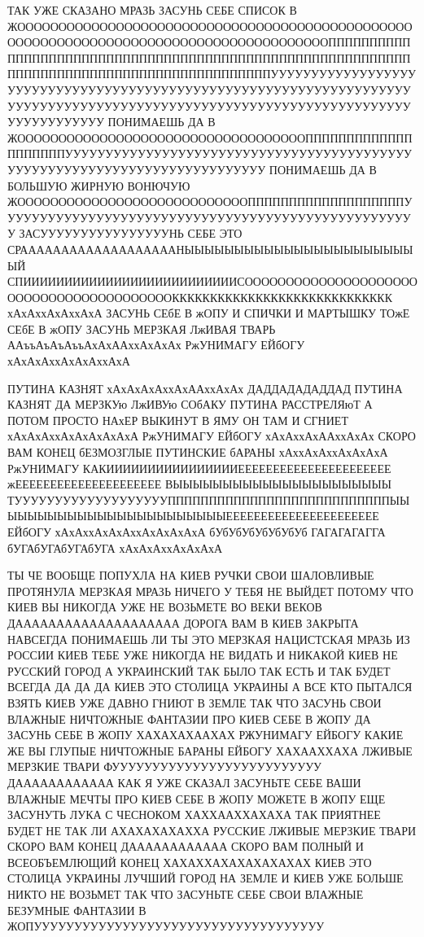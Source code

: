  
 
 
 
 

ТАК УЖЕ СКАЗАНО МРАЗЬ ЗАСУНЬ СЕБЕ СПИСОК В
ЖОООООООООООООООООООООООООООООООООООООООООООООООООООООООООООООООООООООООООООООООООООООООПППППППППППППППППППППППППППППППППППППППППППППППППППППППППППППППППППППППППППППППППППППППППППУУУУУУУУУУУУУУУУУУУУУУУУУУУУУУУУУУУУУУУУУУУУУУУУУУУУУУУУУУУУУУУУУУУУУУУУУУУУУУУУУУУУУУУУУУУУУУУУУУУУУУУУУУУУУУУУУУУУУУУУУУУУУУУУУУ
ПОНИМАЕШЬ ДА В
ЖОООООООООООООООООООООООООООООООООООППППППППППППППППППППУУУУУУУУУУУУУУУУУУУУУУУУУУУУУУУУУУУУУУУУУУУУУУУУУУУУУУУУУУУУУУУУУУУУУУУУУУУ
ПОНИМАЕШЬ ДА В БОЛЬШУЮ ЖИРНУЮ ВОНЮЧУЮ
ЖООООООООООООООООООООООООООООПППППППППППППППППППУУУУУУУУУУУУУУУУУУУУУУУУУУУУУУУУУУУУУУУУУУУУУУУУУУУУ
ЗАСУУУУУУУУУУУУУУУУНЬ СЕБЕ ЭТО СРАААААААААААААААААААНЫЫЫЫЫЫЫЫЫЫЫЫЫЫЫЫЫЫЫЫЫЫЫЫЙ
СПИИИИИИИИИИИИИИИИИИИИИИИИИИСОООООООООООООООООООООООООООООООООООООООООККККККККККККККККККККККККККККК
хАхАххАхАххАхА ЗАСУНЬ СЕбЕ В жОПУ И СПИЧКИ И МАРТЫШКУ ТОжЕ СЕбЕ В жОПУ ЗАСУНЬ МЕРЗКАЯ ЛжИВАЯ ТВАРЬ
ААъъАъАъАъъАхАхААххАхАхАх РжУНИМАГУ ЕЙбОГУ хАхАхАххАхАхАххАхА


ПУТИНА КАЗНЯТ хАхАхАхАххАхААххАхАх ДАДДАДАДАДДАД ПУТИНА КАЗНЯТ ДА МЕРЗКУю ЛжИВУю СОбАКУ
ПУТИНА РАССТРЕЛЯюТ А ПОТОМ ПРОСТО НАхЕР ВЫКИНУТ В ЯМУ ОН ТАМ И СГНИЕТ хАхАхАххАхАхАхАхАхА
РжУНИМАГУ ЕЙбОГУ хАхАххАхААххАхАх СКОРО ВАМ КОНЕЦ бЕЗМОЗГЛЫЕ ПУТИНСКИЕ бАРАНЫ хАххАхАххАхАхАхА
РжУНИМАГУ КАКИИИИИИИИИИИИИИИИЕЕЕЕЕЕЕЕЕЕЕЕЕЕЕЕЕЕЕЕЕЕ жЕЕЕЕЕЕЕЕЕЕЕЕЕЕЕЕЕЕЕЕЕ ВЫЫЫЫЫЫЫЫЫЫЫЫЫЫЫЫЫЫЫЫЫЫ
ТУУУУУУУУУУУУУУУУУУУПППППППППППППППППППППППППППЫЫЫЫЫЫЫЫЫЫЫЫЫЫЫЫЫЫЫЫЫЫЫЫЕЕЕЕЕЕЕЕЕЕЕЕЕЕЕЕЕЕЕЕЕЕ
ЕЙбОГУ хАхАххАхАхАххАхАхАхАхА бУбУбУбУбУбУбУб ГАГАГАГАГГА бУГАбУГАбУГАбУГА хАхАхАххАхАхАхА


ТЫ ЧЕ ВООБЩЕ ПОПУХЛА НА КИЕВ РУЧКИ СВОИ ШАЛОВЛИВЫЕ ПРОТЯНУЛА МЕРЗКАЯ МРАЗЬ
НИЧЕГО У ТЕБЯ НЕ ВЫЙДЕТ ПОТОМУ ЧТО КИЕВ ВЫ НИКОГДА УЖЕ НЕ ВОЗЬМЕТЕ ВО ВЕКИ ВЕКОВ
ДАААААААААААААААААААА ДОРОГА ВАМ В КИЕВ ЗАКРЫТА НАВСЕГДА ПОНИМАЕШЬ ЛИ ТЫ ЭТО
МЕРЗКАЯ НАЦИСТСКАЯ МРАЗЬ ИЗ РОССИИ КИЕВ ТЕБЕ УЖЕ НИКОГДА НЕ ВИДАТЬ
И НИКАКОЙ КИЕВ НЕ РУССКИЙ ГОРОД А УКРАИНСКИЙ ТАК БЫЛО ТАК ЕСТЬ И ТАК БУДЕТ ВСЕГДА
ДА ДА ДА КИЕВ ЭТО СТОЛИЦА УКРАИНЫ А ВСЕ КТО ПЫТАЛСЯ ВЗЯТЬ КИЕВ УЖЕ ДАВНО ГНИЮТ В ЗЕМЛЕ
ТАК ЧТО ЗАСУНЬ СВОИ ВЛАЖНЫЕ НИЧТОЖНЫЕ ФАНТАЗИИ ПРО КИЕВ СЕБЕ В ЖОПУ ДА ЗАСУНЬ СЕБЕ В ЖОПУ
ХАХАХАХААХАХ РЖУНИМАГУ ЕЙБОГУ КАКИЕ ЖЕ ВЫ ГЛУПЫЕ НИЧТОЖНЫЕ БАРАНЫ ЕЙБОГУ ХАХААХХАХА
ЛЖИВЫЕ МЕРЗКИЕ ТВАРИ ФУУУУУУУУУУУУУУУУУУУУУУУУУУ ДАААААААААААА КАК Я УЖЕ СКАЗАЛ
ЗАСУНЬТЕ СЕБЕ ВАШИ ВЛАЖНЫЕ МЕЧТЫ ПРО КИЕВ СЕБЕ В ЖОПУ МОЖЕТЕ В ЖОПУ ЕЩЕ 
ЗАСУНУТЬ ЛУКА С ЧЕСНОКОМ ХАХХААХХАХАХА ТАК ПРИЯТНЕЕ БУДЕТ НЕ ТАК ЛИ АХАХАХАХАХХА
РУССКИЕ ЛЖИВЫЕ МЕРЗКИЕ ТВАРИ СКОРО ВАМ КОНЕЦ ДАААААААААААА СКОРО ВАМ ПОЛНЫЙ И ВСЕОБЪЕМЛЮЩИЙ КОНЕЦ
ХАХАХХАХАХАХАХАХАХ КИЕВ ЭТО СТОЛИЦА УКРАИНЫ ЛУЧШИЙ ГОРОД НА ЗЕМЛЕ И КИЕВ УЖЕ БОЛЬШЕ НИКТО НЕ ВОЗЬМЕТ
ТАК ЧТО ЗАСУНЬТЕ СЕБЕ СВОИ ВЛАЖНЫЕ БЕЗУМНЫЕ ФАНТАЗИИ В ЖОПУУУУУУУУУУУУУУУУУУУУУУУУУУУУУУУУУУУУ

